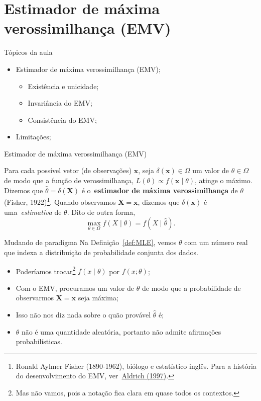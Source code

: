 \section*{Estimador de máxima verossimilhança (EMV)}
\begin{frame}{Tópicos da aula}
 \begin{itemize}
  \item Estimador de máxima verossimilhança (EMV);
  \begin{itemize}
     \item Existência e unicidade;
     \item Invariância do EMV;
     \item Consistência do EMV;
  \end{itemize}
  \item Limitações;
 \end{itemize}
\end{frame}

\begin{frame}{Estimador de máxima verossimilhança (EMV)}
 \begin{defn}
 \label{def:MLE}
  Para cada possível vetor (de observações) $\boldsymbol{x}$, seja $\delta(\boldsymbol{x}) \in \Omega$ um valor de $\theta \in \Omega$ de modo que a função de verossimilhança, $L(\theta) \propto f(\boldsymbol{x} \mid \theta)$, atinge o máximo.
  Dizemos que $\hat{\theta} = \delta(\boldsymbol{X})$ é o~\textbf{estimador de máxima verossimilhança} de $\theta$ (Fisher, 1922)\footnote{Ronald Aylmer Fisher (1890-1962), biólogo e estatístico inglês. Para a história do desenvolvimento do EMV, ver~\href{https://projecteuclid.org/euclid.ss/1030037906}{Aldrich (1997)}.}.
  Quando observamos $\boldsymbol{X} = \boldsymbol{x}$, dizemos que $\delta(\boldsymbol{x})$ é uma~\textit{estimativa} de $\theta$.
  Dito de outra forma,
   $$ \max_{\theta \in \Omega} f(X \mid \theta) = f(X\mid \hat{\theta}).$$
 \end{defn}
\end{frame}

\begin{frame}{Mudando de paradigma}
Na Definição~\ref{def:MLE}, vemos $\theta$ com um número real que indexa a distribuição de probabilidade conjunta dos dados.

\begin{itemize}
 \item Poderíamos trocar\footnote{Mas não vamos, pois a notação fica clara em quase todos os contextos.} $f(x \mid \theta)$ por $f(x; \theta)$;
 \item Com o EMV, procuramos um valor de $\theta$ de modo que a probabilidade de observarmos $\boldsymbol{X} = \boldsymbol{x}$ seja máxima;
 \item Isso não nos diz nada sobre o quão provável $\hat{\theta}$ é;
 \item $\theta$ não é uma quantidade aleatória, portanto não admite afirmações probabilísticas.
\end{itemize}
\end{frame}

